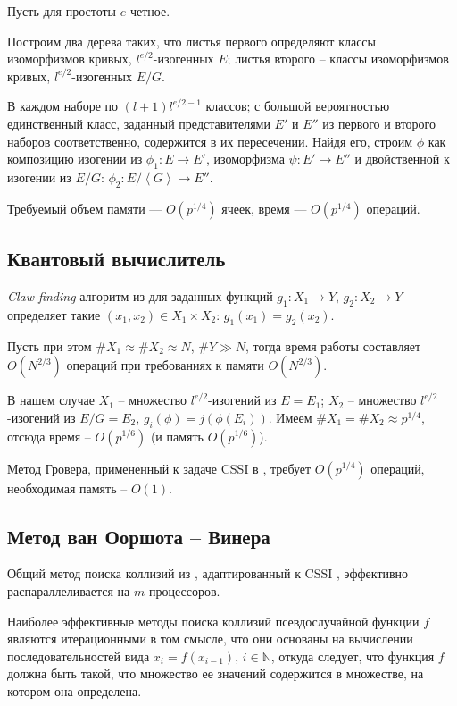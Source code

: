 \documentclass[a4paper,12pt]{article}
\newcommand{\NN}{\mathbb{N}}
\newcommand{\tr}[1]{\left\langle #1\right\rangle}
\theoremstyle{definition}
\begin{document}
 Пусть для простоты $e$ четное.
 
Построим два дерева таких, что листья первого определяют классы изоморфизмов кривых, $l^{e/2}$-изогенных $E$;
листья второго -- классы изоморфизмов кривых, $l^{e/2}$-изогенных $E/G$.

В каждом наборе по $(l+1)l^{e/2-1}$ классов; с большой вероятностью единственный класс, заданный представителями $E'$ и $E''$ из первого и второго наборов соответственно, содержится в их пересечении. Найдя его, строим 
$\phi$ как композицию изогении из $\phi_1:E\to E'$, изоморфизма $\psi:E'\to E''$ и двойственной к изогении из $E/G$: ${\phi}_2:E/\tr{G}\to E''$.

Требуемый объем памяти --- $O(p^{1/4})$ ячеек, время --- $O(p^{1/4})$ операций.


 \subsection*{Квантовый вычислитель}

\emph{Claw-finding} алгоритм из \cite{quant} для заданных функций $g_1:X_1\to Y$, $g_2:X_2\to Y$ определяет такие $(x_1, x_2)\in X_1\times X_2$: $g_1(x_1)=g_2(x_2)$.

Пусть при этом $\#X_1\approx \#X_2 \approx N$, $\#Y\gg N$, тогда время работы составляет $O(N^{2/3})$ операций при требованиях к памяти $O(N^{2/3})$.

В нашем случае $X_1 $ -- множество $l^{e/2}$-изогений  из $E=E_1$; $X_2$ -- множество $l^{e/2}$-изогений  из $E/G=E_2$, $g_i(\phi)=j(\phi(E_i))$.
Имеем $\#X_1=\#X_2\approx p^{1/4}$, отсюда  время -- $O(p^{1/6})$ (и память $O(p^{1/6})$).

Метод Гровера, примененный к задаче CSSI в \cite{FFF}, требует $O(p^{1/4})$ операций,  необходимая память -- $O(1)$.


 \subsection*{Метод ван Ооршота -- Винера}
 
Общий метод поиска коллизий из \cite{vOW}, адаптированный к CSSI \cite{Adj,Costello}, эффективно распараллеливается на $m$ процессоров.

Наиболее эффективные методы поиска коллизий псевдослучайной функции $f$ являются итерационными в том смысле, что они основаны на вычислении 
последовательностей вида $x_i = f(x_{i-1})$, $i \in \NN$, откуда следует, что функция $f$ должна быть такой, что множество ее значений содержится в множестве, 
на котором она определена.
 
\end{document}
